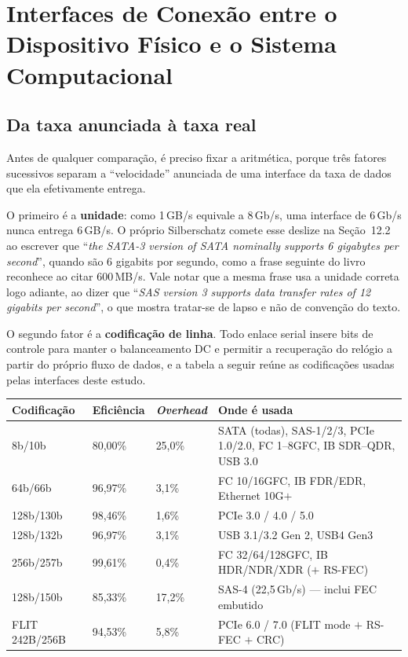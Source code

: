 \documentclass[11pt,a4paper]{article}
\begin{document}
\section{Interfaces de Conexão entre o Dispositivo Físico e o Sistema Computacional}

\subsection{Da taxa anunciada à taxa real}

Antes de qualquer comparação, é preciso fixar a aritmética, porque três fatores sucessivos
separam a ``velocidade'' anunciada de uma interface da taxa de dados que ela efetivamente entrega.

O primeiro é a \textbf{unidade}: como 1\,GB/s equivale a 8\,Gb/s, uma interface de 6\,Gb/s nunca
entrega 6\,GB/s. O próprio Silberschatz comete esse deslize na Seção~12.2 ao escrever que ``\emph{the
SATA-3 version of SATA nominally supports 6 gigabytes per second}'', quando são 6 gigabits por
segundo, como a frase seguinte do livro reconhece ao citar 600\,MB/s. Vale notar que a mesma frase
usa a unidade correta logo adiante, ao dizer que ``\emph{SAS version 3 supports data transfer rates
of 12 gigabits per second}'', o que mostra tratar-se de lapso e não de convenção do texto.

O segundo fator é a \textbf{codificação de linha}. Todo enlace serial insere bits de controle para
manter o balanceamento DC e permitir a recuperação do relógio a partir do próprio fluxo de dados, e a
tabela a seguir reúne as codificações usadas pelas interfaces deste estudo.

\begin{center}\small
\begin{tabular}{@{}lllp{7.4cm}@{}}
\toprule
\textbf{Codificação} & \textbf{Eficiência} & \textbf{\emph{Overhead}} & \textbf{Onde é usada} \\
\midrule
8b/10b        & 80,00\% & 25,0\% & SATA (todas), SAS-1/2/3, PCIe 1.0/2.0, FC 1--8GFC, IB SDR--QDR, USB 3.0 \\
64b/66b       & 96,97\% & 3,1\%  & FC 10/16GFC, IB FDR/EDR, Ethernet 10G$+$ \\
128b/130b     & 98,46\% & 1,6\%  & PCIe 3.0 / 4.0 / 5.0 \\
128b/132b     & 96,97\% & 3,1\%  & USB 3.1/3.2 Gen 2, USB4 Gen3 \\
256b/257b     & 99,61\% & 0,4\%  & FC 32/64/128GFC, IB HDR/NDR/XDR ($+$ RS-FEC) \\
128b/150b     & 85,33\% & 17,2\% & SAS-4 (22,5\,Gb/s) --- inclui FEC embutido \\
FLIT 242B/256B & 94,53\% & 5,8\% & PCIe 6.0 / 7.0 (FLIT mode $+$ RS-FEC $+$ CRC) \\
\bottomrule
\end{tabular}
\end{center}
\end{document}
